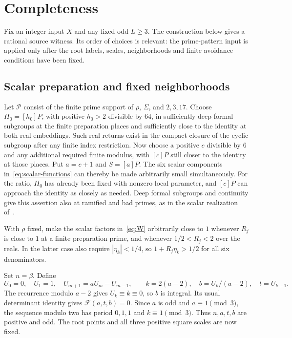 \documentclass[11pt,a4paper]{article}
\begin{document}
\section{Completeness}

Fix an integer input $X$ and any fixed odd $L\ge3$.
The construction below gives a rational source witness. Its order
of choices is relevant: the prime-pattern input is applied only
after the root labels, scales, neighborhoods and finite avoidance
conditions have been fixed.

\subsection{Scalar preparation and fixed neighborhoods}

Let $\mathcal P$ consist of the finite prime support of $\rho$,
$\Sigma$, and $2,3,17$. Choose $H_0=[h_0]P$, with positive
$h_0>2$ divisible by $64$, in sufficiently deep formal subgroups
at the finite preparation places and sufficiently close to the
identity at both real embeddings. Such real returns exist in the
compact closure of the cyclic subgroup after any finite index
restriction. Now choose a positive $c$ divisible by $6$ and any
additional required finite modulus, with $[c]P$ still closer to
the identity at those places. Put $a=c+1$ and $S=[a]P$.
The six scalar components in~\eqref{eq:scalar-functions} can
thereby be made arbitrarily small simultaneously. For the ratio,
$H_0$ has already been fixed with nonzero local parameter, and
$[c]P$ can approach the identity as closely as needed. Deep formal
subgroups and continuity give this assertion also at ramified
and bad primes, as in the scalar realization of~\cite{Source}.

With $\rho$ fixed, make the scalar factors in~\eqref{eq:W}
arbitrarily close to $1$ whenever $R_j$ is close to $1$ at
a finite preparation prime, and whenever $1/2<R_j<2$ over the
reals. In the latter case also require $|\eta_k|<1/4$, so
$1+R_j\eta_k>1/2$ for all six denominators.

Set $n=\beta$. Define
\[
 U_0=0,\quad U_1=1,\quad U_{m+1}=aU_m-U_{m-1},\qquad
 k=2(a-2),\quad b=U_k/(a-2),\quad t=U_{k+1}.
\]
The recurrence modulo $a-2$ gives $U_k\equiv k\equiv0$, so
$b$ is integral. Its usual determinant identity gives
$\mathcal F(a,t,b)=0$. Since $a$ is odd and $a\equiv1\pmod3$,
the sequence modulo two has period $0,1,1$ and $k\equiv1\pmod3$.
Thus $n,a,t,b$ are positive and odd. The root points and all three
positive square scales are now fixed.
\end{document}
